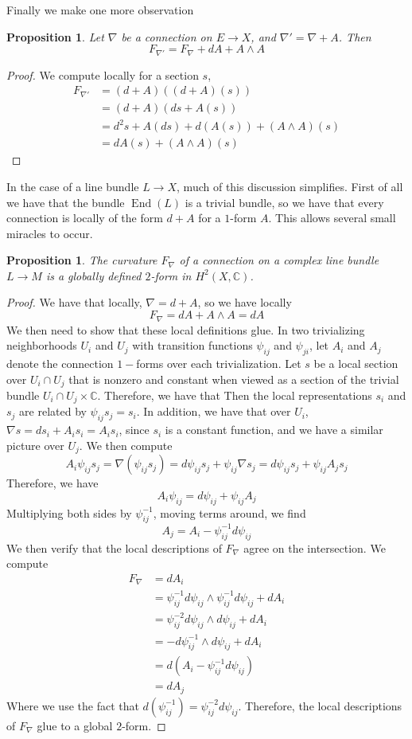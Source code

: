 \documentclass[psamsfonts, 12pt]{amsart}
\newtheorem{prop}[thm]{Proposition}
\theoremstyle{definition}
\theoremstyle{remark}
\newcommand{\C}{\mathbb{C}}
\newcommand{\inv}{^{-1}}
\DeclareMathOperator{\End}{End}
\begin{document}
%
Finally we make one more observation
%
\begin{prop}
Let $\nabla$ be a connection on $E \to X$, and $\nabla' = \nabla + A$. Then
\[
F_{\nabla'} = F_\nabla + dA + A \wedge A
\]
\end{prop}
%
\begin{proof}
We compute locally for a section $s$,
\begin{align*}
F_{\nabla'} &= (d + A)((d+A)(s)) \\
&= (d+A)(ds + A(s)) \\
&= d^2s + A(ds) + d(A(s)) + (A \wedge A)(s) \\
&= dA(s) + (A \wedge A)(s)
\end{align*}
\end{proof}
%
In the case of a line bundle $L \to X$, much of this discussion simplifies. First of all
we have that the bundle $\End(L)$ is a trivial bundle, so we have that every
connection is locally of the form $d + A$ for a $1$-form $A$. This allows several
small miracles to occur.
%
\begin{prop}
The curvature $F_\nabla$ of a connection on a complex line bundle $L \to M$
is a globally defined $2$-form in $H^2(X, \C)$.
\end{prop}
%
\begin{proof}
We have that locally, $\nabla = d + A$, so we have locally
\[
F_\nabla =  dA + A \wedge A = dA
\]
We then need to show that these local definitions glue. In two trivializing
neighborhoods $U_i$ and $U_j$ with transition functions $\psi_{ij}$ and $\psi_{ji}$,
let $A_i$ and $A_j$ denote the connection $1-$forms over each trivialization.
Let $s$ be a local section over $U_i \cap U_j$ that is nonzero and constant when viewed as a
section of the trivial bundle $U_i \cap U_j \times \C$. Therefore, we have that
Then the local representations $s_i$ and $s_j$ are related by $\psi_{ij}s_j = s_i$.
In addition, we have that over $U_i$, $\nabla s = ds_i + A_is_i = A_is_i$, since
$s_i$ is a constant function, and we have a similar picture over $U_j$. We then
compute
\[
A_i\psi_{ij}s_j = \nabla(\psi_{ij}s_j) = d\psi_{ij}s_j + \psi_{ij}\nabla s_j
= d\psi_{ij}s_j + \psi_{ij}A_js_j
\]
Therefore, we have
\[
A_i\psi_{ij} = d\psi_{ij} + \psi_{ij}A_j
\]
Multiplying both sides by $\psi_{ij}\inv$, moving terms around, we find
\[
A_j = A_i - \psi_{ij}\inv d\psi_{ij}
\]
We then verify that the local descriptions of $F_\nabla$ agree on the intersection. We
compute
\begin{align*}
F_\nabla &= dA_i \\
&= \psi_{ij}\inv d\psi_{ij} \wedge \psi_{ij}\inv d\psi_{ij} + dA_i \\
&= \psi_{ij}^{-2}d\psi_{ij} \wedge d\psi_{ij} + dA_i \\
&= -d\psi_{ij}\inv \wedge d\psi_{ij} + dA_i \\
&= d(A_i - \psi_{ij}\inv d\psi_{ij}) \\
&= dA_j
\end{align*}
Where we use the fact that $d(\psi_{ij}\inv) = \psi_{ij}^{-2}d\psi_{ij}$. Therefore,
the local descriptions of $F_\nabla$ glue to a global $2$-form.
\end{proof}
\end{document}
